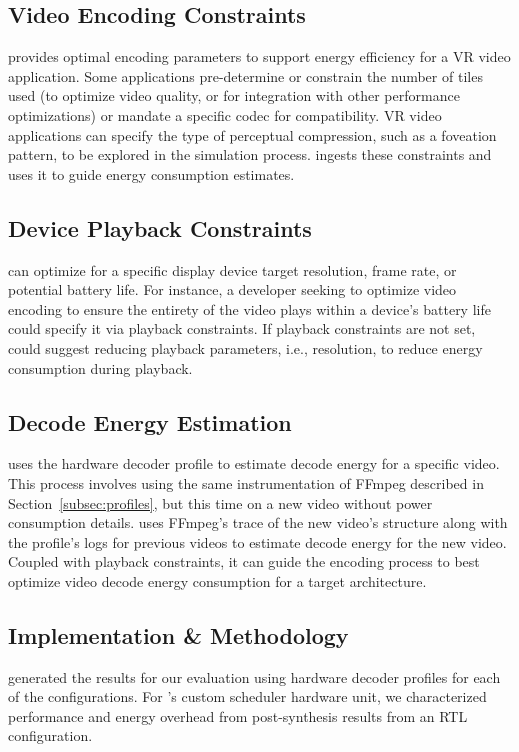 \subsection{Video Encoding Constraints}
\nameArchprof provides optimal encoding parameters to support energy efficiency for a VR video application.
Some applications pre-determine or constrain the number of tiles used (to optimize video quality, or for integration with other performance optimizations) or mandate a specific codec for compatibility.
VR video applications can specify the type of perceptual compression, such as a foveation pattern, to be explored in the simulation process.
\nameArchprof ingests these constraints and uses it to guide energy consumption estimates.

\subsection{Device Playback Constraints}
\nameArchprof can optimize for a specific display device target resolution, frame rate, or potential battery life.
For instance, a developer seeking to optimize video encoding to ensure the entirety of the video plays within a device's battery life could specify it via playback constraints.
If playback constraints are not set, \nameArchprof could suggest reducing playback parameters, i.e., resolution, to reduce energy consumption during playback.

\subsection{Decode Energy Estimation}
\nameArchprof uses the hardware decoder profile to estimate decode energy for a specific video.
This process involves using the same instrumentation of {FFmpeg} described in Section~\ref{subsec:profiles}, but this time on a new video without power consumption details.
\nameArchprof uses {FFmpeg}'s trace of the new video's structure along with the profile's logs for previous videos to estimate decode energy for the new video.
Coupled with playback constraints, it can guide the encoding process to best optimize video decode energy consumption for a target architecture.


\subsection{Implementation \& Methodology}
\nameArchprof generated the results for our evaluation using hardware decoder profiles for each of the \nameArch configurations.
For \nameArch's custom scheduler hardware unit, we characterized performance and energy overhead from post-synthesis results from an RTL configuration.

